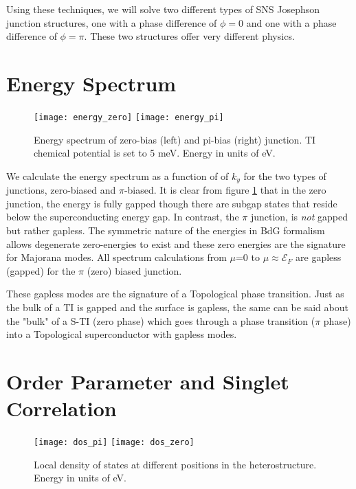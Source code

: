 \documentclass[11pt]{report}
\begin{document}
Using these techniques, we will solve two different types of SNS Josephson junction structures, one with a phase difference of $\phi=0$ and one with a phase difference of $\phi=\pi$. These two structures offer very different physics.


\clearpage

\section{Energy Spectrum}

\begin{figure}[h]
\texttt{[image: energy\_zero]}
\texttt{[image: energy\_pi]}
\caption{Energy spectrum of zero-bias (left) and pi-bias (right) junction. TI chemical potential is set to 5 meV. Energy in units of eV.
}\label{jj-energy}
\end{figure}

We calculate the energy spectrum as a function of of $k_y$ for the two types of junctions, zero-biased and $\pi$-biased. It is clear from figure \ref{jj-energy} that in the zero junction, the energy is fully gapped though there are subgap states that reside below the superconducting energy gap. In contrast, the $\pi$ junction, is {\it not} gapped but rather gapless. The symmetric nature of the energies in BdG formalism allows degenerate zero-energies to exist and these zero energies are the signature for Majorana modes. All spectrum calculations from $\mu$=0 to $\mu \approx \mathcal{E}_F $ are gapless (gapped) for the $\pi$ (zero) biased junction.

These gapless modes are the signature of a Topological phase transition. Just as the bulk of a TI is gapped and the surface is gapless, the same can be said about the "bulk" of a S-TI (zero phase) which goes through a phase transition ($\pi$ phase) into a Topological superconductor with gapless modes. 

\section{Order Parameter and Singlet Correlation}

\begin{figure}
\texttt{[image: dos\_pi]}
\texttt{[image: dos\_zero]}
\caption{Local density of states at different positions in the heterostructure. Energy in units of eV.
}\label{ldos}
\end{figure}
\end{document}
